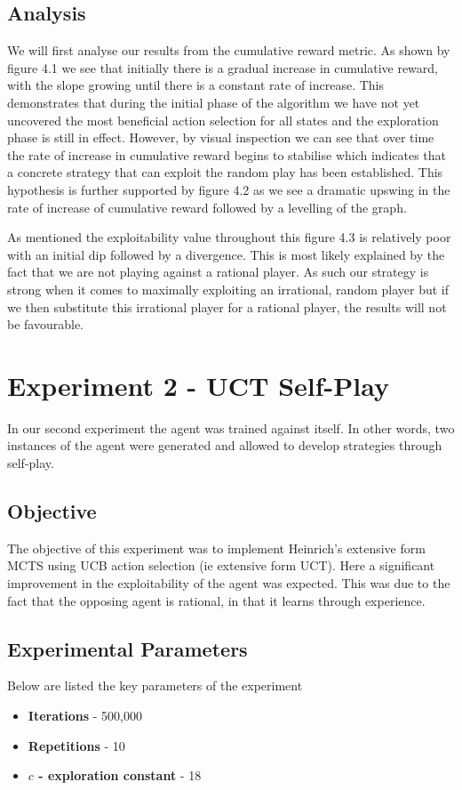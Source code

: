 \subsection{Analysis}\label{subsec:analysis1}
We will first analyse our results from the cumulative reward metric.
As shown by figure 4.1 we see that initially there is a gradual increase in cumulative reward,
with the slope growing until there is a constant rate of increase.
This demonstrates that during the initial phase of the algorithm we have not yet uncovered
the most beneficial action selection for all states and the exploration phase is still in effect.
However, by visual inspection we can see that over time the rate of increase in cumulative
reward begins to stabilise which indicates that a concrete strategy that can exploit
the random play has been established.
This hypothesis is further supported by figure 4.2 as we see a dramatic upswing
in the rate of increase of cumulative reward followed by a levelling of the graph.

As mentioned the exploitability value throughout this figure 4.3 is relatively poor with an initial dip followed
by a divergence.
This is most likely explained by the fact that we are not playing against a rational player.
As such our strategy is strong when it comes to maximally exploiting an irrational, random player
but if we then substitute this irrational player for a rational player, the results will not be favourable.

\section{Experiment 2 - UCT Self-Play} \label{sec:experiment2}
In our second experiment the agent was trained against itself.
In other words, two instances of the agent were generated and allowed to develop strategies
through self-play.

\subsection{Objective}\label{subsec:objective2}
The objective of this experiment was to implement Heinrich's extensive form MCTS using UCB action
selection (ie extensive form UCT).
Here a significant improvement in the exploitability of the agent was expected.
This was due to the fact that the opposing agent is rational, in that it learns
through experience.


\subsection{Experimental Parameters}\label{subsec:algAndCoding2}
Below are listed the key parameters of the experiment
\begin{itemize}
    \item \textbf{Iterations} - 500,000
    \item \textbf{Repetitions} - 10
    \item \textbf{$c$ - exploration constant} - 18
\end{itemize}


